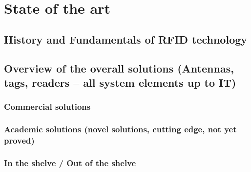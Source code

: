 
\chapter{State of the art}

\section{History and Fundamentals of RFID technology}

\section{Overview of the overall solutions (Antennas, tags, readers -- all system elements up to IT)}

\subsection{Commercial solutions}

\subsection{Academic solutions (novel solutions, cutting edge, not yet proved)}

\subsection{In the shelve / Out of the shelve}